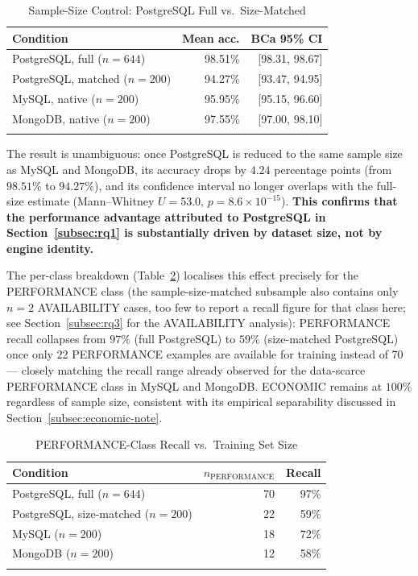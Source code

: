 \documentclass[pdflatex,sn-mathphys-num]{sn-jnl}
\theoremstyle{thmstyleone}
\theoremstyle{thmstylethree}
\begin{document}
\begin{table}[h]
\caption{Sample-Size Control: PostgreSQL Full vs.\ Size-Matched}\label{tab:size-control}
\begin{tabular}{@{}lrr@{}}
\toprule
Condition & Mean acc. & BCa 95\% CI \\
\midrule
PostgreSQL, full ($n=644$)         & 98.51\% & [98.31, 98.67] \\
PostgreSQL, matched ($n=200$)      & 94.27\% & [93.47, 94.95] \\
MySQL, native ($n=200$)            & 95.95\% & [95.15, 96.60] \\
MongoDB, native ($n=200$)          & 97.55\% & [97.00, 98.10] \\
\botrule
\end{tabular}
\end{table}

The result is unambiguous: once PostgreSQL is reduced to the same
sample size as MySQL and MongoDB, its accuracy drops by $4.24$
percentage points (from $98.51\%$ to $94.27\%$), and its confidence
interval no longer overlaps with the full-size estimate (Mann--Whitney
$U=53.0$, $p=8.6\times10^{-15}$). \textbf{This confirms that the
performance advantage attributed to PostgreSQL in
Section~\ref{subsec:rq1} is substantially driven by dataset size,
not by engine identity.}

The per-class breakdown (Table~\ref{tab:size-control-classes})
localises this effect precisely for the PERFORMANCE class (the
sample-size-matched subsample also contains only $n=2$ AVAILABILITY
cases, too few to report a recall figure for that class here; see
Section~\ref{subsec:rq3} for the AVAILABILITY analysis): PERFORMANCE recall collapses from
$97\%$ (full PostgreSQL) to $59\%$ (size-matched PostgreSQL) once only
22 PERFORMANCE examples are available for training instead of 70 ---
closely matching the recall range already observed for the
data-scarce PERFORMANCE class in MySQL and MongoDB. ECONOMIC remains
at $100\%$ regardless of sample size, consistent with its empirical
separability discussed in Section~\ref{subsec:economic-note}.

\begin{table}[h]
\caption{PERFORMANCE-Class Recall vs.\ Training Set Size}\label{tab:size-control-classes}
\begin{tabular}{@{}lrr@{}}
\toprule
Condition & $n_{\text{PERFORMANCE}}$ & Recall \\
\midrule
PostgreSQL, full ($n=644$)         & 70 & 97\% \\
PostgreSQL, size-matched ($n=200$) & 22 & 59\% \\
MySQL ($n=200$)                    & 18 & 72\% \\
MongoDB ($n=200$)                  & 12 & 58\% \\
\botrule
\end{tabular}
\end{table}
\end{document}
